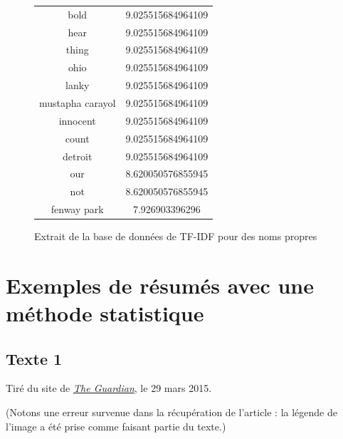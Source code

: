 \documentclass[a4paper, 12pt]{article}
\begin{document}
\begin{figure}[h!]
\begin{center}
\begin{tabular}{|c|c|}
  bold  & 9.025515684964109 \\
  hear  & 9.025515684964109 \\
  thing  & 9.025515684964109 \\
  ohio  & 9.025515684964109 \\
  lanky  & 9.025515684964109 \\
  mustapha carayol  & 9.025515684964109 \\
  innocent  & 9.025515684964109 \\
  count  & 9.025515684964109 \\
  detroit  & 9.025515684964109 \\
  our  & 8.620050576855945 \\
  not  & 8.620050576855945 \\
  fenway park  & 7.926903396296 \\
  \hline
 \end{tabular}
\label{fig:TFIDFNoms}
\caption{Extrait de la base de données de TF-IDF pour des noms propres}
\end{center}
\end{figure}

\newpage

\section{Exemples de résumés avec une méthode statistique}

\subsection{Texte 1}

Tiré du site de \href{http://www.theguardian.com/football/2015/mar/29/georgia-germany-euro-2016-match-report}{\textit{The Guardian}}, le 29 mars 2015.

(Notons une erreur survenue dans la récupération de l'article : la légende de l'image a été prise comme faisant partie du texte.)\\
\end{document}
